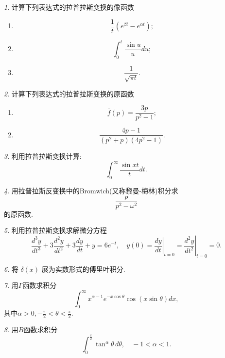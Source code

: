 \documentclass[11pt]{article}
\theoremstyle{remark}
\newtheorem{problem}{}
\begin{document}
\renewcommand{\labelenumi}{(\arabic{enumi})}
\renewcommand{\labelenumii}{(\arabic{enumi}.\arabic{enumii})}

\begin{problem}
    计算下列表达式的拉普拉斯变换的像函数
    \begin{enumerate}
      \item $$
      \frac{1}{t}\left(e^{\beta t}-e^{\alpha t}\right) ;
      $$
      \item $$
      \int_0^t \frac{\sin u}{u} d u;
      $$
      \item 
      $$
      \frac{1}{\sqrt{\pi t}}.
      $$
    \end{enumerate}
\end{problem}

\begin{problem}
    计算下列表达式的拉普拉斯变换的原函数
    \begin{enumerate}
      \item $$
      \bar{f}(p)=\frac{3 p}{p^2-1} ;
      $$
      \item $$
      \frac{4 p-1}{\left(p^2+p\right)\left(4 p^2-1\right)}.
      $$
    \end{enumerate}
\end{problem}

\begin{problem}
    利用拉普拉斯变换计算:  $$\int_0^{\infty} \frac{\sin x t}{t} dt. $$
\end{problem}
   
\begin{problem}
用拉普拉斯反变换中的Bromwich(又称黎曼-梅林)积分求
$$
\frac{p}{p^2 - \omega^2}
$$
的原函数.
\end{problem}

\begin{problem}
    利用拉普拉斯变换求解微分方程
    $$
      \frac{d^3 y}{d t^3}+3 \frac{d^2 y}{d t^2}+3 \frac{d y}{d t}+y=6 e^{-t}, 
      \quad y(0)=\left.\frac{d y}{d t}\right|_{t=0}=\left.\frac{d^2 y}{d t^2}\right|_{t=0}=0 .
    $$
\end{problem}
  

\begin{problem}
    将 $\delta(x)$ 展为实数形式的傅里叶积分.
\end{problem}

\begin{problem}
    用$\Gamma$函数求积分
    $$
    \int_0^\infty x^{\alpha -1 } e^{-x \cos{\theta}} \cos\left( x \sin{\theta} \right) dx,
    $$
    其中$\alpha > 0, -\frac{\pi}{2} < \theta < \frac{\pi}{2}$.  
\end{problem}

  
  
\begin{problem}
用$B$函数求积分
$$
\int_0^{\frac{\pi}{2}} \tan^\alpha{\theta} \,  d\theta, \quad  -1 < \alpha < 1.
$$
\end{problem}
    



\end{document}
